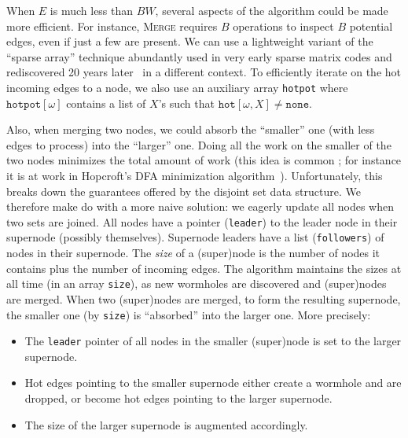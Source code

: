 \documentclass[a4paper,UKenglish,cleveref, autoref]{lipics-v2021}
\begin{document}
When $E$ is much less than $BW$, several aspects of the algorithm could be made
more efficient. For instance, \textsc{Merge} requires $B$ operations to inspect
$B$ potential edges, even if just a few are present. We can use a lightweight
variant of the ``sparse array'' technique abundantly used in very early sparse
matrix codes and rediscovered 20 years later~\cite{10.1145/176454.176484} in a
different context. To efficiently iterate on the hot incoming edges to a node,
we also use an auxiliary array \texttt{hotpot} where $\texttt{hotpot}[\omega]$
contains a list of $X$'s such that $\texttt{hot}[\omega, X] \neq \texttt{none}$.

Also, when merging two nodes, we could absorb the ``smaller'' one (with less
edges to process) into the ``larger'' one. Doing all the work on the smaller of
the two nodes minimizes the total amount of work (this idea is common ; for
instance it is at work in Hopcroft's DFA minimization
algorithm~\cite{hopcroft1971nlogn}). Unfortunately, this breaks down the
guarantees offered by the disjoint set data structure. We therefore make do with
a more naive solution: we eagerly update all nodes when two sets are joined.
All nodes have a pointer (\texttt{leader}) to the leader node in their supernode
(possibly themselves). Supernode leaders have a list (\texttt{followers}) of
nodes in their supernode. The \emph{size} of a (super)node is the number of
nodes it contains plus the number of incoming edges. The algorithm maintains the
sizes at all time (in an array \texttt{size}), as new wormholes are discovered
and (super)nodes are merged. When two (super)nodes are merged, to form the
resulting supernode, the smaller one (by \texttt{size}) is ``absorbed'' into the
larger one. More precisely:
\begin{itemize}
\item The \texttt{leader} pointer of all nodes in the smaller (super)node is set to the
  larger supernode.
\item Hot edges pointing to the smaller supernode either create a wormhole and
  are dropped, or become hot edges pointing to the larger supernode.
\item The size of the larger supernode is augmented accordingly.
\end{itemize}
\end{document}
